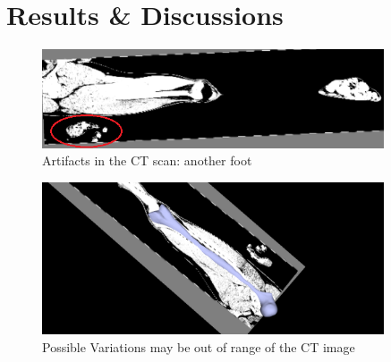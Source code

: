 \documentclass{article}
\begin{document}
	
	\section{Results \& Discussions}
		\begin{figure}
			\centering
			\includegraphics[width=0.9\textwidth]{images/CT_10_foot.png}
			\caption{Artifacts in the CT scan: another foot}
			\label{2.1}
		\end{figure}		
		\begin{figure}
			\centering
			\includegraphics[width=0.9\textwidth]{images/segmentation_10_outofrange.png}
			\caption{Possible Variations may be out of range of the CT image}
			\label{2.2}
		\end{figure}
	
\end{document}
